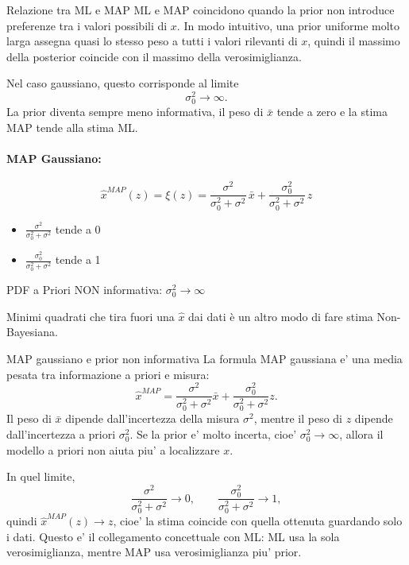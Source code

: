 \documentclass[11pt,a4paper]{article}
\begin{document}
\begin{spiegazione}{Relazione tra ML e MAP}
ML e MAP coincidono quando la prior non introduce preferenze tra i valori possibili di $x$. In modo intuitivo, una prior uniforme molto larga assegna quasi lo stesso peso a tutti i valori rilevanti di $x$, quindi il massimo della posterior coincide con il massimo della verosimiglianza.

Nel caso gaussiano, questo corrisponde al limite
\[
\sigma_0^2\to\infty.
\]
La prior diventa sempre meno informativa, il peso di $\bar x$ tende a zero e la stima MAP tende alla stima ML.
\end{spiegazione}



\paragraph{MAP Gaussiano:}

\[
\hat x^{MAP}(z)=\xi(z)=
\frac{\sigma^2}{\sigma_0^2+\sigma^2}\,\bar x
+
\frac{\sigma_0^2}{\sigma_0^2+\sigma^2}\,z
\]

\begin{itemize}
    \item $\frac{\sigma^2}{\sigma_0^2+\sigma^2}$ tende a 0
    \item $\frac{\sigma_0^2}{\sigma_0^2+\sigma^2}$ tende a 1
\end{itemize}

PDF a Priori NON informativa: $\sigma_0^2 \to \infty$

Minimi quadrati che tira fuori una $\hat x$ dai dati è un altro modo di fare stima Non-Bayesiana.

\begin{spiegazione}{MAP gaussiano e prior non informativa}
La formula MAP gaussiana e' una media pesata tra informazione a priori e misura:
\[
\hat x^{MAP}
=
\frac{\sigma^2}{\sigma_0^2+\sigma^2}\bar x
+
\frac{\sigma_0^2}{\sigma_0^2+\sigma^2}z.
\]
Il peso di $\bar x$ dipende dall'incertezza della misura $\sigma^2$, mentre il peso di $z$ dipende dall'incertezza a priori $\sigma_0^2$. Se la prior e' molto incerta, cioe' $\sigma_0^2\to\infty$, allora il modello a priori non aiuta piu' a localizzare $x$.

In quel limite,
\[
\frac{\sigma^2}{\sigma_0^2+\sigma^2}\to 0,
\qquad
\frac{\sigma_0^2}{\sigma_0^2+\sigma^2}\to 1,
\]
quindi $\hat x^{MAP}(z)\to z$, cioe' la stima coincide con quella ottenuta guardando solo i dati. Questo e' il collegamento concettuale con ML: ML usa la sola verosimiglianza, mentre MAP usa verosimiglianza piu' prior.
\end{spiegazione}
\end{document}
